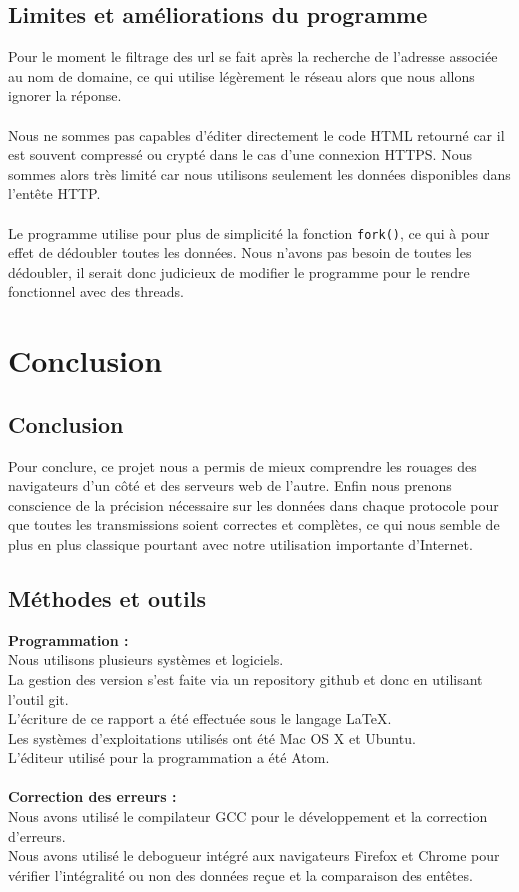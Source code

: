 \documentclass{scrreprt}
\def\code#1{\texttt{#1}}
\begin{document}
\section{Limites et améliorations du programme}
Pour le moment le filtrage des url se fait après la recherche de l'adresse associée au nom de domaine, ce qui utilise légèrement le réseau alors que nous allons ignorer la réponse.\\
\\
Nous ne sommes pas capables d'éditer directement le code HTML retourné car il est souvent compressé ou crypté dans le cas d'une connexion HTTPS. Nous sommes alors très limité car nous utilisons seulement les données disponibles dans l'entête HTTP.\\
\\
Le programme utilise pour plus de simplicité la fonction \code{fork()}, ce qui à pour effet de dédoubler toutes les données. Nous n'avons pas besoin de toutes les dédoubler, il serait donc judicieux de modifier le programme pour le rendre fonctionnel avec des threads.\\

\chapter{Conclusion}

\section{Conclusion}
Pour conclure, ce projet nous a permis de mieux comprendre les rouages des navigateurs d'un côté et des serveurs web de l'autre. Enfin nous prenons conscience de la précision nécessaire sur les données dans chaque protocole pour que toutes les transmissions soient correctes et complètes, ce qui nous semble de plus en plus classique pourtant avec notre utilisation importante d'Internet.

\section{Méthodes et outils}
\textbf{Programmation :}\\
Nous utilisons plusieurs systèmes et logiciels.\\
La gestion des version s'est faite via un repository github et donc en utilisant l'outil git.\\
L'écriture de ce rapport a été effectuée sous le langage LaTeX.\\
Les systèmes d'exploitations utilisés ont été Mac OS X et Ubuntu.\\
L'éditeur utilisé pour la programmation a été Atom.\\\\
\textbf{Correction des erreurs :}\\
Nous avons utilisé le compilateur GCC pour le développement et la correction d'erreurs.\\
Nous avons utilisé le debogueur intégré aux navigateurs Firefox et Chrome pour vérifier l'intégralité ou non des données reçue et la comparaison des entêtes.
\end{document}
